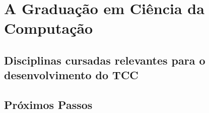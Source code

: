 \chapter{A Graduação em Ciência da Computação}
\label{cap:a_graduacao}

\section{Disciplinas cursadas relevantes para o desenvolvimento do TCC}
\label{sec:disciplinas_relevantes}

\section{Próximos Passos}
\label{sec:proximos_passos}
